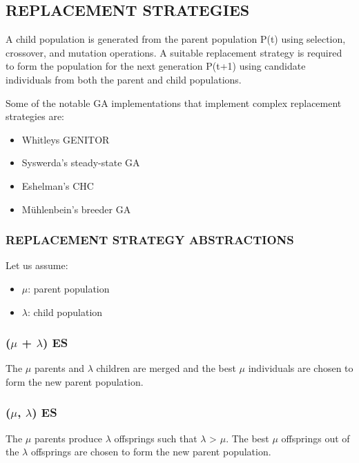 \documentclass[12pt,a4paper]{article}
\begin{document}
	\subsection{REPLACEMENT STRATEGIES}
	A child population is generated from the parent population P(t) using selection, crossover, and mutation operations. A suitable replacement strategy is required to form the population for the next generation P(t+1) using candidate individuals from both the parent and child populations.
	
	Some of the notable GA implementations that implement complex replacement strategies are:
	\begin{itemize}
	\item Whitleys GENITOR
	\item Syswerda’s steady-state GA
	\item Eshelman’s CHC
	\item Mühlenbein’s breeder GA
	\end{itemize}
	
	\subsubsection{REPLACEMENT STRATEGY ABSTRACTIONS}
	Let us assume:
	\begin{itemize}
	\item $\mu$: parent population
	\item $\lambda$: child population
	\end{itemize}
	
	\subsubsection{($\mu$ + $\lambda$) ES}
	The $\mu$ parents and $\lambda$ children are merged and the best $\mu$ individuals are chosen to form the new parent population.
	
	\subsubsection{($\mu$, $\lambda$) ES}
	The $\mu$ parents produce $\lambda$ offsprings such that $\lambda$ > $\mu$. The best $\mu$ offsprings out of the $\lambda$ offsprings are chosen to form the new parent population.
	
\end{document}
